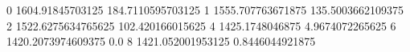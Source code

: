 0 1604.91845703125 184.7110595703125
1 1555.707763671875 135.5003662109375
2 1522.6275634765625 102.420166015625
4 1425.1748046875 4.9674072265625
6 1420.2073974609375 0.0
8 1421.052001953125 0.8446044921875
